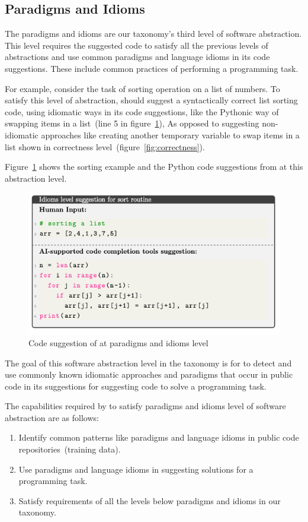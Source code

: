 \subsection{Paradigms and Idioms}
The paradigms and idioms are our taxonomy's third level of software abstraction. 
This level requires the suggested code to satisfy all the previous levels of abstractions and use common paradigms and language idioms in its code suggestions. These include common practices of performing a programming task. 

For example, consider the task of sorting operation on a list of numbers. 
To satisfy this level of abstraction, \cct{} should suggest a syntactically correct list sorting code, using idiomatic ways in its code suggestions, like the Pythonic way of swapping items in a list~(line 5 in figure~\ref{fig:idioms}), As opposed to suggesting non-idiomatic approaches like creating another temporary variable to swap items in a list shown in correctness level~(figure~\ref{fig:correctness}).

Figure~\ref{fig:idioms} shows the sorting example and the Python code suggestions from \cct{} at this abstraction level.

\begin{figure}[hbt!]
    \centering
    \includegraphics[width=\linewidth]{Figures/idioms.png}
    \caption{Code suggestion of \cct{} at paradigms and idioms level}
    \label{fig:idioms}
\end{figure}

The goal of this software abstraction level in the taxonomy is for \cct{} to detect and use commonly known idiomatic approaches and paradigms that occur in public code in its suggestions for suggesting code to solve a programming task.

The capabilities required by \cct{} to satisfy paradigms and idioms level of software abstraction are as follows:
\begin{enumerate}
    \item Identify common patterns like paradigms and language idioms in public code repositories~(training data).
    \item Use paradigms and language idioms in suggesting solutions for a programming task.
    \item Satisfy requirements of all the levels below paradigms and idioms in our taxonomy.
\end{enumerate}


